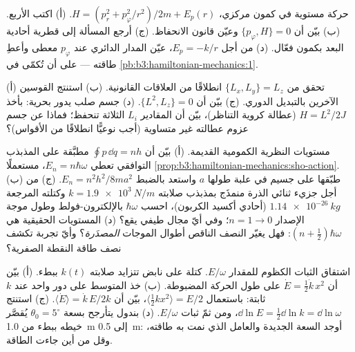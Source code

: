 \begin{exercise}[$\star\star$]\label{exo:b3:hamiltonian-mechanics:8}
حركة مستوية في كمون مركزي، $H = (p_r^2 + p_\varphi^2/r^2)/2m
+ E_p(r)$. (أ) اكتب  الأربع. (ب) بيّن أن $\{
p_\varphi, H\} = 0$ وعيّن قانون الانحفاظ. (ج) أرجع المسألة إلى
 قطرية أحادية البعد بكمون فعّال. (د)
من أجل $E_p = -k/r$، عيّن المدار الدائري عند $p_\varphi$ معطى
وأعطِ طاقته --- على أن تُكمّى في
\cref{pb:b3:hamiltonian-mechanics:1}.
\end{exercise}

\begin{exercise}[$\star\star$]\label{exo:b3:hamiltonian-mechanics:9}
(أ) تحقق من $\{L_x, L_y\} = L_z$ انطلاقًا من العلاقات القانونية.
(ب) استنتج القوسين الآخرين بالتبديل الدوري. (ج) بيّن أن
$\{L^2, L_z\} = 0$. (د) جسم صلب يدور بحرية: بأخذ $H =
L^2/2J$ (عطالة كروية التناظر)، بيّن أن المقادير $L_i$ الثلاثة تنحفظ؛
فماذا عن جسم عزوم عطالته غير متساوية (أجب
نوعيًّا انطلاقًا من الأقواس)؟
\end{exercise}

\begin{exercise}[$\star\star\star$]\label{exo:b3:hamiltonian-mechanics:10}
مستويات النظرية الكمومية القديمة. (أ) بيّن أن $\oint p\,\dd q = nh$
مطبَّقة على المذبذب التوافقي تعطي $E_n = n\hbar\omega$، مستعملًا
\cref{prop:b3:hamiltonian-mechanics:sho-action}. (ب) طبّقها على
جسيم في علبة طولها $a$ واستعد بالضبط $E_n =
n^2h^2/8ma^2$. (ج) من أجل جزيء ثنائي الذرة منمذَج بمذبذب
صلابته $k = \qty{1.9e3}{N/m}$ وكتلته المرجعة $\qty{1.14e-26}
{kg}$ (أحادي أكسيد الكربون)، احسب $\hbar\omega$ بالإلكترون-فولط وطول
موجة الإصدار $n = 1 \to 0$؛ وفي أيّ مجال طيفي يقع؟
(د) المستويات الحقيقية هي $(n + \tfrac12)\hbar\omega$: فهل يغيّر
النصف الناقص أطوال الموجات \emph{المصدَرة}؟ وأيّ تجربة تكشف نصف
طاقة النقطة الصفرية؟
\end{exercise}

\begin{exercise}[$\star\star\star$]\label{exo:b3:hamiltonian-mechanics:11}
اشتقاق الثبات الكظوم للمقدار $E/\omega$. كتلة على نابض تتزايد
صلابته $k(t)$ ببطء. (أ) بيّن أن $\dot E = \tfrac12\dot k\,
x^2$ على طول الحركة المضبوطة. (ب) خذ المتوسط على دور واحد عند $k$ ثابتة:
باستعمال $\langle\tfrac12 kx^2\rangle = E/2$، بيّن أن $\langle\dot E\rangle
= \dot k\,E/2k$. (ج) استنتج $\dd\ln E = \tfrac12\dd\ln k = \dd\ln
\omega$، ومن ثمّ ثبات $E/\omega$. (د) بندول يتأرجح بسعة
$\theta_0 = 5^\circ$ يُقصَّر خيطه ببطء من
\qty{1.0}{m} إلى \qty{0.5}{m}: أوجد السعة الجديدة والعامل الذي
نمت به طاقته، وقل من أين جاءت الطاقة.
\end{exercise}

